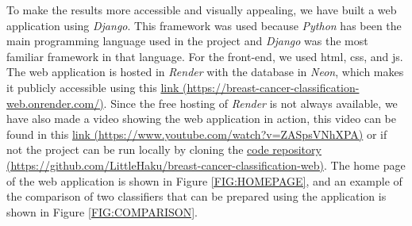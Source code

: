 
To make the results more accessible and visually appealing, we have built a web application using \textit{Django}. This framework was used because \textit{Python} has been the main programming language used in the project and \textit{Django} was the most familiar framework in that language. For the front-end, we used \ac{html}, \ac{css}, and \ac{js}. The web application is hosted in \textit{Render} with the database in \textit{Neon}, which makes it publicly accessible using this \href{https://breast-cancer-classification-web.onrender.com/}{link (https://breast-cancer-classification-web.onrender.com/)}. Since the free hosting of \textit{Render} is not always available, we have also made a video showing the web application in action, this video can be found in this \href{https://www.youtube.com/watch?v=ZASpsVNhXPA}{link (https://www.youtube.com/watch?v=ZASpsVNhXPA)} or if not the project can be run locally by cloning the \href{https://github.com/LittleHaku/breast-cancer-classification-web}{code repository (https://github.com/LittleHaku/breast-cancer-classification-web)}.
The home page of the web application is shown in Figure \ref{FIG:HOMEPAGE}, and an example of the comparison of two classifiers that can be prepared using the application is shown in Figure \ref{FIG:COMPARISON}.